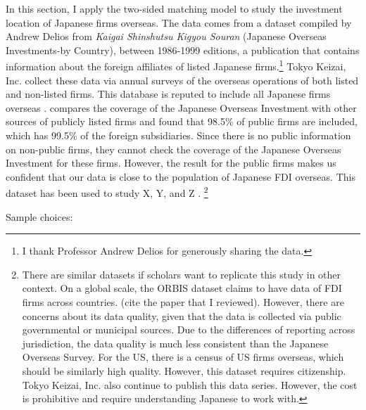 In this section, I apply the two-sided matching model to study the investment
location of Japanese firms overseas. The data comes from a dataset compiled by
Andrew Delios from \textit{Kaigai Shinshutsu Kigyou Souran} (Japanese Overseas
Investments-by Country), between 1986-1999 editions, a publication that contains
information about the foreign affiliates of listed Japanese firms.\footnote{I
thank Professor Andrew Delios for generously sharing the data.} Tokyo Keizai,
Inc. collect these data via annual surveys of the overseas operations of both
listed and non-listed firms. This database is reputed to include all Japanese
firms overseas \citep{Yamawaki1991}. \citep{Delios2001} compares the coverage of
the Japanese Overseas Investment with other sources of publicly listed firms and
found that 98.5\% of public firms are included, which has 99.5\% of the foreign
subsidiaries. Since there is no public information on non-public firms, they
cannot check the coverage of the Japanese Overseas Investment for these firms.
However, the result for the public firms makes us confident that our data is
close to the population of Japanese FDI overseas. This dataset has been used to
study X, Y, and Z \citep{Delios2000}. \footnote{There are similar datasets if
scholars want to replicate this study in other context. On a global scale, the
ORBIS dataset claims to have data of FDI firms across countries. (cite the paper
that I reviewed). However, there are concerns about its data quality, given that
the data is collected via public governmental or municipal sources. Due to the
differences of reporting across jurisdiction, the data quality is much less
consistent than the Japanese Overseas Survey. For the US, there is a census of
US firms overseas, which should be similarly high quality. However, this dataset
requires citizenship. Tokyo Keizai, Inc. also continue to publish this data
series. However, the cost is prohibitive and require understanding Japanese to
work with.}



Sample choices:

